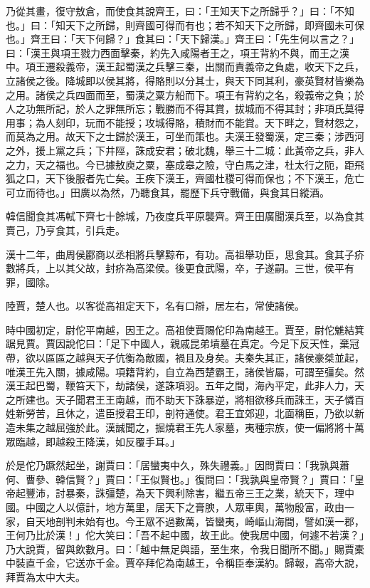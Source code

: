 \begin{pinyinscope}
乃從其畫，復守敖倉，而使食其說齊王，曰：「王知天下之所歸乎？」曰：「不知也。」曰：「知天下之所歸，則齊國可得而有也；若不知天下之所歸，即齊國未可保也。」齊王曰：「天下何歸？」食其曰：「天下歸漢。」齊王曰：「先生何以言之？」曰：「漢王與項王戮力西面擊秦，約先入咸陽者王之，項王背約不與，而王之漢中。項王遷殺義帝，漢王起蜀漢之兵擊三秦，出關而責義帝之負處，收天下之兵，立諸侯之後。降城即以侯其將，得賂則以分其士，與天下同其利，豪英賢材皆樂為之用。諸侯之兵四面而至，蜀漢之粟方船而下。項王有背約之名，殺義帝之負；於人之功無所記，於人之罪無所忘；戰勝而不得其賞，拔城而不得其封；非項氏莫得用事；為人刻印，玩而不能授；攻城得賂，積財而不能賞。天下畔之，賢材怨之，而莫為之用。故天下之士歸於漢王，可坐而策也。夫漢王發蜀漢，定三秦；涉西河之外，援上黨之兵；下井陘，誅成安君；破北魏，舉三十二城：此黃帝之兵，非人之力，天之福也。今已據敖庾之粟，塞成皋之險，守白馬之津，杜太行之阨，距飛狐之口，天下後服者先亡矣。王疾下漢王，齊國杜稷可得而保也；不下漢王，危亡可立而待也。」田廣以為然，乃聽食其，罷歷下兵守戰備，與食其日縱酒。

韓信聞食其馮軾下齊七十餘城，乃夜度兵平原襲齊。齊王田廣聞漢兵至，以為食其賣己，乃亨食其，引兵走。

漢十二年，曲周侯酈商以丞相將兵擊黥布，有功。高祖舉功臣，思食其。食其子疥數將兵，上以其父故，封疥為高梁侯。後更食武陽，卒，子遂嗣。三世，侯平有罪，國除。

陸賈，楚人也。以客從高祖定天下，名有口辯，居左右，常使諸侯。

時中國初定，尉佗平南越，因王之。高祖使賈賜佗印為南越王。賈至，尉佗魋結箕踞見賈。賈因說佗曰：「足下中國人，親戚昆弟墳墓在真定。今足下反天性，棄冠帶，欲以區區之越與天子伉衡為敵國，禍且及身矣。夫秦失其正，諸侯豪桀並起，唯漢王先入關，據咸陽。項籍背約，自立為西楚霸王，諸侯皆屬，可謂至彊矣。然漢王起巴蜀，鞭笞天下，劫諸侯，遂誅項羽。五年之間，海內平定，此非人力，天之所建也。天子聞君王王南越，而不助天下誅暴逆，將相欲移兵而誅王，天子憐百姓新勞苦，且休之，遣臣授君王印，剖符通使。君王宜郊迎，北面稱臣，乃欲以新造未集之越屈強於此。漢誠聞之，掘燒君王先人家墓，夷種宗族，使一偏將將十萬眾臨越，即越殺王降漢，如反覆手耳。」

於是佗乃蹶然起坐，謝賈曰：「居蠻夷中久，殊失禮義。」因問賈曰：「我孰與蕭何、曹參、韓信賢？」賈曰：「王似賢也。」復問曰：「我孰與皇帝賢？」賈曰：「皇帝起豐沛，討暴秦，誅彊楚，為天下興利除害，繼五帝三王之業，統天下，理中國。中國之人以億計，地方萬里，居天下之膏腴，人眾車輿，萬物殷富，政由一家，自天地剖判未始有也。今王眾不過數萬，皆蠻夷，崎嶇山海間，譬如漢一郡，王何乃比於漢！」佗大笑曰：「吾不起中國，故王此。使我居中國，何遽不若漢？」乃大說賈，留與飲數月。曰：「越中無足與語，至生來，令我日聞所不聞。」賜賈橐中裝直千金，它送亦千金。賈卒拜佗為南越王，令稱臣奉漢約。歸報，高帝大說，拜賈為太中大夫。


\end{pinyinscope}
